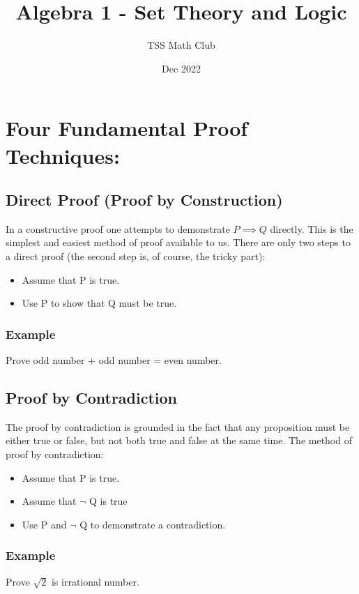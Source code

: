 \documentclass{article}
\title{Algebra 1 - Set Theory and Logic}
\author{TSS Math Club}
\date{Dec 2022}
\begin{document}
\large

\maketitle

\section{Four Fundamental Proof Techniques:}

\subsection{Direct Proof (Proof by Construction)}
In a constructive proof one attempts to demonstrate $P \implies Q$ directly. This is
the simplest and easiest method of proof available to us. There are only two
steps to a direct proof (the second step is, of course, the tricky part):
\begin{itemize}
    \item Assume that P is true.
    \item Use P to show that Q must be true.
\end{itemize}
\subsubsection{Example}
Prove odd number + odd number = even number.
\vspace{40px}

\subsection{Proof by Contradiction}
The proof by contradiction is grounded in the fact that any proposition must
be either true or false, but not both true and false at the same time. The method of proof by contradiction:
\begin{itemize}
    \item Assume that P is true.
    \item Assume that $\neg$ Q is true
    \item Use P and $\neg$ Q to demonstrate a contradiction.
\end{itemize}
\subsubsection{Example}
Prove $\sqrt{2}$ is irrational number.
\pagebreak
\end{document}
